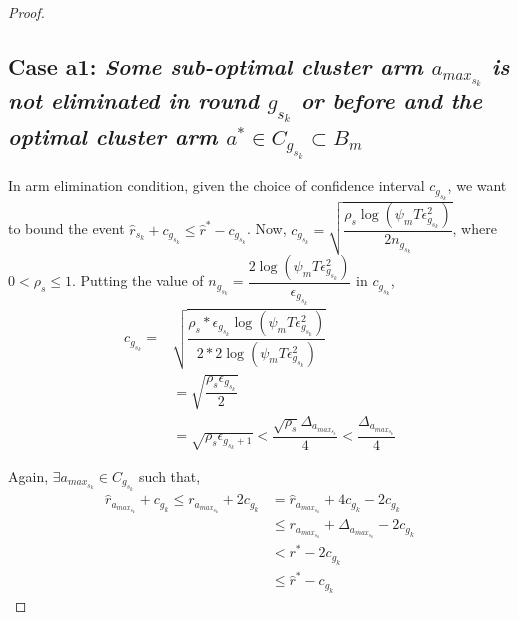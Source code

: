 \begin{proof}
\subsection*{Case a1: \textit{ Some sub-optimal cluster arm $a_{max_{s_{k}}}$ is not eliminated in round $g_{s_{k}}$ or before and the optimal cluster arm $a^{*}\in C_{g_{s_{k}}} \subset B_{m}$ }}

	In arm elimination condition, given the choice of confidence interval $c_{g_{s_{k}}}$, we want to bound the event $\hat{r}_{s_{k}}+c_{g_{s_{k}}}\leq \hat{r}^{*}-c_{g_{s_{k}}}$.
  Now, $c_{g_{s_{k}}}=\sqrt{\dfrac{\rho_{s} \log (\psi_{m}T\epsilon_{g_{s_{k}}}^{2})}{2 n_{g_{s_{k}}}}}$, where $0 < \rho_{s}\leq 1$.
  Putting the value of $n_{g_{s_{k}}}=\dfrac{2\log{(\psi_{m}T\epsilon_{g_{s_{k}}}^{2})}}{\epsilon_{g_{s_{k}}}}$ in $c_{g_{s_{k}}}$,
  \begin{align*}
  c_{g_{s_{k}}}= & \sqrt{\dfrac{\rho_{s}*\epsilon_{g_{s_{k}}}\log (\psi_{m}T\epsilon_{g_{s_{k}}}^{2})}{2*2 \log(\psi_{m}T\epsilon_{g_{s_{k}}}^{2})}}\\
  &=\sqrt{\dfrac{\rho_{s}\epsilon_{g_{s_{k}}}}{2}}\\
  &=\sqrt{\rho_{s}\epsilon_{g_{s_{k}}+1}} < \dfrac{\sqrt{\rho_{s}}\Delta_{a_{max_{s_{k}}}}}{4} < \dfrac{\Delta_{a_{max_{s_{k}}}}}{4}
  \end{align*}

  Again, $\exists a_{max_{s_{k}}} \in C_{g_{s_{k}}}$ such that, 
  \begin{align*}
  \hat{r}_{a_{max_{s_{k}}}} + c_{g_{k}}\leq r_{a_{max_{s_{k}}}} + 2c_{g_{k}} &= \hat{r}_{a_{max_{s_{k}}}} + 4c_{g_{k}} - 2c_{g_{k}}\\
  &\leq r_{a_{max_{s_{k}}}} + \Delta_{a_{max_{s_{k}}}} - 2c_{g_{k}}\\
  &< r^{*} -2c_{g_{k}}\\
  &\leq \hat{r}^{*} - c_{g_{k}}
  \end{align*}
   

\end{proof}
